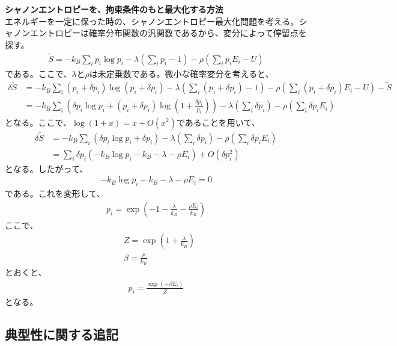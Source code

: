 \documentclass[a4paper,11pt]{jsarticle}
\numberwithin{equation}{section}
\begin{document}
\textbf{シャノンエントロピーを、拘束条件のもと最大化する方法}\\
エネルギーを一定に保った時の、シャノンエントロピー最大化問題を考える。シャノンエントロピーは確率分布関数の汎関数であるから、変分によって停留点を探す。
\begin{align}
  \tilde{S}= -k_B\sum_{i}p_i\log p_i -\lambda\left(\sum_{i}p_i - 1\right)-\rho\left(\sum_{i}p_iE_i - U\right)  
\end{align}
である。ここで、$\lambda$と$\rho$は未定乗数である。微小な確率変分を考えると、
\begin{align}
  \delta \tilde{S} &= -k_B\sum_{i}(p_i + \delta p_i)\log (p_i + \delta p_i) -\lambda\left(\sum_{i}(p_i + \delta p_i)- 1\right) -\rho\left(\sum_{i}(p_i + \delta p_i)E_i - U\right)-\tilde{S}\\
  &= -k_B\sum_{i}\left(\delta p_i\log p_i + (p_i + \delta p_i)\log \left(1 + \frac{\delta p_i}{p_i}\right)\right)  -\lambda\left(\sum_{i}\delta p_i\right)-\rho\left(\sum_{i}\delta p_iE_i\right)
\end{align}
となる。ここで、$\log(1+x) = x + O(x^2)$であることを用いて、
\begin{align}
  \delta \tilde{S} &= -k_B\sum_{i}\left(\delta p_i\log p_i + \delta p_i\right)  -\lambda\left(\sum_{i}\delta p_i\right)-\rho\left(\sum_{i}\delta p_iE_i\right)\\
  &= \sum_{i}\delta p_i\left(-k_B\log p_i - k_B - \lambda - \rho E_i\right) + O(\delta p_i^2)
\end{align}
となる。したがって、
\begin{align}
  -k_B\log p_i - k_B - \lambda - \rho E_i = 0
\end{align}
である。これを変形して、
\begin{align}
  p_i = \exp(-1-\frac{\lambda}{k_B}-\frac{\rho E_i}{k_B})
\end{align}
ここで、
\begin{align}
  &Z = \exp(1 + \frac{\lambda}{k_B})\\
  &\beta = \frac{\rho}{k_B}
\end{align}
とおくと、
\begin{align}
  p_i = \frac{\exp(-\beta E_i)}{Z}
\end{align}
となる。

\subsection{典型性に関する追記}

\newpage
\end{document}
